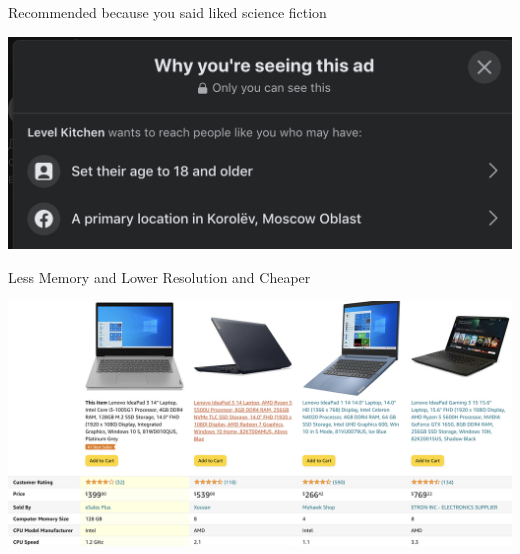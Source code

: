 \documentclass[11pt,aspectratio=169]{beamer}
\begin{document}
\begin{frame}

\begin{tcolorbox}[colback=info!5,colframe=info!80,title=Content-based]
Recommended because you said liked science fiction
\end{tcolorbox}

\vfill

\begin{center}
\includegraphics[scale=0.3]{images/facebook.png}
\end{center}

\end{frame}

\begin{frame}

\begin{tcolorbox}[colback=info!5,colframe=info!80,title=Knowledge-based]
Less Memory and Lower Resolution and Cheaper
\end{tcolorbox}

\vfill

\begin{center}
\includegraphics[scale=0.2]{images/amazon2.png}
\end{center}

\end{frame}
\end{document}
